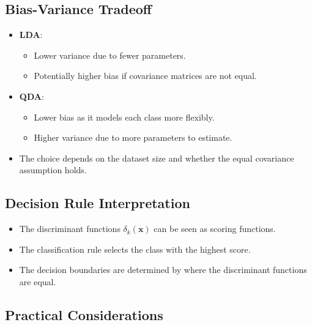 \documentclass{article}
\begin{document}
\subsection{Bias-Variance Tradeoff}

\begin{itemize}
  \item \textbf{LDA}:
  \begin{itemize}
    \item Lower variance due to fewer parameters.
    \item Potentially higher bias if covariance matrices are not equal.
  \end{itemize}
  \item \textbf{QDA}:
  \begin{itemize}
    \item Lower bias as it models each class more flexibly.
    \item Higher variance due to more parameters to estimate.
  \end{itemize}
  \item The choice depends on the dataset size and whether the equal covariance assumption holds.
\end{itemize}

\subsection{Decision Rule Interpretation}

\begin{itemize}
  \item The discriminant functions $\delta_k(\mathbf{x})$ can be seen as scoring functions.
  \item The classification rule selects the class with the highest score.
  \item The decision boundaries are determined by where the discriminant functions are equal.
\end{itemize}

\subsection{Practical Considerations}
\end{document}
